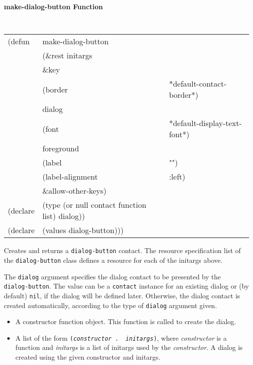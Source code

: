 
{\samepage
{\large {\bf make-dialog-button \hfill Function}} 
\begin{flushright} \parbox[t]{6.125in}{
\tt
\begin{tabular}{lll}
\raggedright
(defun & make-dialog-button \\
       & (\&rest initargs \\
       & \&key  \\
       & (border                & *default-contact-border*) \\ 
       & dialog       &  \\   
       & (font                  & *default-display-text-font*) \\ 
       & foreground \\
       & (label                 & "") \\ 
       & (label-alignment       & :left) \\   
       &   \&allow-other-keys) \\
(declare &(type (or null contact function list) dialog))\\
(declare & (values   dialog-button)))
\end{tabular}
\rm

}\end{flushright}}

\begin{flushright} \parbox[t]{6.125in}{
Creates and returns a {\tt dialog-button} contact.
The resource specification list of the {\tt dialog-button} class defines
a resource for each of the initargs above.

The {\tt dialog} argument specifies the dialog contact to be presented by the {\tt
dialog-button}. The value can be a {\tt contact} instance for an existing dialog
or (by default) {\tt nil}, if the dialog will be defined later. Otherwise, the
dialog contact is created automatically, according to the type of {\tt dialog}
argument given.  

\begin{itemize}
\item A constructor function object. This function is called to create the dialog.

\item A list of the form {\tt ({\em constructor} .  {\em
initargs})}, where {\em constructor} is a function and {\em initargs}
is a list of initargs used by the {\em
constructor}. A dialog is created using the given constructor and initargs.

\end{itemize}


}\end{flushright}

